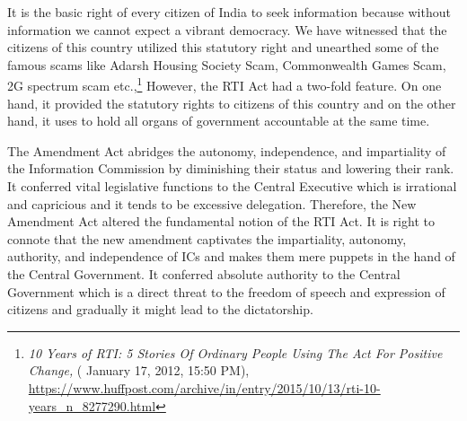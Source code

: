 \begin{multicols}{2}
\noi
It is the basic right of every citizen of India to seek information because without information
we cannot expect a vibrant democracy. We have witnessed that the citizens of this country
utilized this statutory right and unearthed some of the famous scams like Adarsh Housing
Society Scam, Commonwealth Games Scam, 2G spectrum scam etc.,\footnote{\textit{10 Years of RTI: 5 Stories Of Ordinary People Using The Act For Positive Change,} ( January 17, 2012, 15:50
PM), \url{https://www.huffpost.com/archive/in/entry/2015/10/13/rti-10-years_n_8277290.html}} However, the RTI Act
had a two-fold feature. On one hand, it provided the statutory rights to citizens of this country
and on the other hand, it uses to hold all organs of government accountable at the same time. 

\noi
The Amendment Act abridges the autonomy, independence, and impartiality of the
Information Commission by diminishing their status and lowering their rank. It conferred
vital legislative functions to the Central Executive which is irrational and capricious and it
tends to be excessive delegation. Therefore, the New Amendment Act altered the
fundamental notion of the RTI Act. It is right to connote that the new amendment captivates
the impartiality, autonomy, authority, and independence of ICs and makes them mere puppets
in the hand of the Central Government. It conferred absolute authority to the Central
Government which is a direct threat to the freedom of speech and expression of citizens and
gradually it might lead to the dictatorship.

\end{multicols}
\label{end2020-art2}
